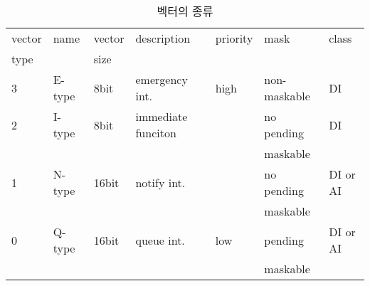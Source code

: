 %
%
\begin{table}[htbp]
\caption{벡터의 종류}\label{table:vec-type}
   \begin{center}
   \begin{tabular}{|l|l|l|l|l|l|l|} \hline
	vector & name   & vector & description & priority & mask & class \\
	type   &        & size   &              &          &      & \\
\hline \hline
	3      & E-type & 8bit   & emergency int. & high & non-maskable & DI \\
\hline
	2      & I-type & 8bit   & immediate funciton & & no pending & DI \\
	       &        &        &                    & & maskable &  \\
\hline
	1      & N-type & 16bit  & notify int. & & no pending & DI or AI \\
	       &        &        &             & & maskable & \\
\hline
	0      & Q-type & 16bit  & queue int. & low & pending & DI or AI \\
	       &        &        &            &     & maskable & \\
\hline
   \end{tabular}
   \end{center}
\end{table}
%
%
